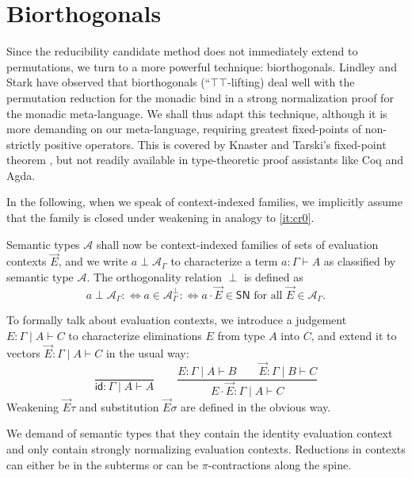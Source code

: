 \documentclass[a4paper,USenglish,cleveref, autoref, thm-restate]{lipics-v2019}
\newcommand{\defiff}{\mathrel{{{:}{\Longleftrightarrow}}}}
\newcommand{\tid}{\mathsf{id}}
\newcommand{\ru}{\dfrac}
\newcommand{\A}{\mathcal{A}}
\newcommand{\SN}{\mathsf{SN}}
\begin{document}
\section{Biorthogonals}
\label{sec:biortho}

Since the reducibility candidate method does not immediately extend to
permutations, we turn to a more powerful technique: biorthogonals.
Lindley and Stark \cite{lindleyStark:redComput} have observed that
biorthogonals (``$\top\top$-lifting) deal well with the permutation
reduction for the monadic bind in a strong normalization proof for the
monadic meta-language.  We shall thus adapt this technique, although
it is more demanding on our meta-language, requiring greatest
fixed-points of non-strictly positive operators.  This is covered by
Knaster and Tarski's fixed-point theorem \cite{tarski:fixpoint}, but
not readily available in type-theoretic proof assistants like Coq and
Agda.

In the following, when we speak of context-indexed families, we
implicitly assume that the family is closed under weakening in analogy
to \ref{it:cr0}.

Semantic types $\A$ shall now be context-indexed families of sets of
evaluation contexts $\vec E$, and we write $a \perp \A_\Gamma$ to
characterize a term $a : \Gamma \vdash A$ as classified by semantic
type $\A$.  The orthogonality relation $\perp$ is defined as
\[
  a \perp \A_\Gamma \defiff
  a \in \A_\Gamma^\perp \defiff
  a \cdot \vec E \in \SN \mbox{ for all } \vec E \in \A_\Gamma
  .
\]

To formally talk about evaluation contexts, we introduce a judgement
$E : \Gamma \mid A \vdash C$ to characterize eliminations $E$ from type $A$
into $C$, and extend it to vectors $\vec E : \Gamma \mid A \vdash C$
in the usual way:
\[
  \ru{}{\tid : \Gamma \mid A \vdash A}
\qquad
  \ru{E : \Gamma \mid A \vdash B \qquad
      \vec E : \Gamma \mid B \vdash C
    }{E \cdot \vec E : \Gamma \mid A \vdash C}
\]
Weakening $\vec E \tau$ and substitution $\vec E \sigma$ are defined
in the obvious way.

We demand of semantic types that they contain the identity evaluation
context and only contain strongly normalizing evaluation contexts.
Reductions in contexts can either be in the subterms or can be
$\pi$-contractions along the spine.
\end{document}
